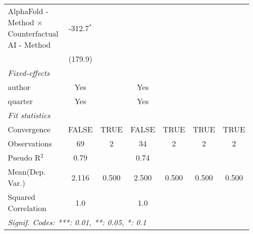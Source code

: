 \begin{tabular}{lcccccc}
   AlphaFold - Method $\times$ Counterfactual AI - Method  & -312.7$^{*}$  &      &            &      &      &   \\   
                                                           & (179.9)       &      &            &      &      &   \\   
   \midrule
   \emph{Fixed-effects}\\
   author                                                  & Yes           &      & Yes        &      &      & \\  
   quarter                                                 & Yes           &      & Yes        &      &      & \\  
   \midrule
   \emph{Fit statistics}\\
   Convergence                                             &FALSE          & TRUE & FALSE      & TRUE & TRUE & TRUE\\  
   Observations                                            & 69            & 2    & 34         & 2    & 2    & 2\\  
   Pseudo R$^2$                                            & 0.79          &      & 0.74       &      &      & \\  
Mean(Dep. Var.) & 2.116 & 0.500 & 2.500 & 0.500 & 0.500 & 0.500 \\
   Squared Correlation                                     & 1.0           &      & 1.0        &      &      & \\  
   \midrule \midrule
   \multicolumn{7}{l}{\emph{Signif. Codes: ***: 0.01, **: 0.05, *: 0.1}}\\
\end{tabular}
\par\endgroup
